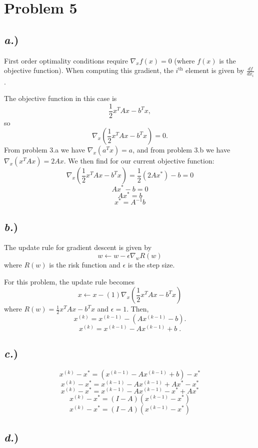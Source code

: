 \documentclass{report}
\begin{document}
\newpage
\section*{Problem 5}

\subsection*{\textit{a.})}

First order optimality conditions require $\nabla_xf(x) = 0$ (where $f(x)$ is the objective function). When computing this gradient, the $i^{\text{th}}$ element is given by $\frac{df}{dx_i}$.

The objective function in this case is 
$$ \frac{1}{2}x^TAx-b^Tx ,$$
so 
$$ \nabla_x\left(\frac{1}{2}x^TAx-b^Tx\right) = 0 .$$
From problem 3.a we have $\nabla_x(a^Tx) = a$, and from problem 3.b we have $\nabla_x(x^TAx) = 2Ax$. We then find for our current objective function:
$$ \nabla_x\left(\frac{1}{2}x^TAx-b^Tx\right) = \frac{1}{2}(2Ax^*) - b = 0 $$
$$ Ax^* - b = 0 $$
$$ Ax^* = b $$
$$\boxed{ x^* = A^{-1}b }$$

\subsection*{\textit{b.})}

The update rule for gradient descent is given by
$$ w \leftarrow w - \epsilon\nabla_w R(w) $$
where $R(w)$ is the risk function and $\epsilon$ is the step size. 

For this problem, the update rule becomes
$$ x \leftarrow x - (1)\nabla_x\left(\frac{1}{2}x^TAx-b^Tx\right) $$
where $R(w) = \frac{1}{2}x^TAx-b^Tx$ and $\epsilon = 1$. Then,
$$ x^{(k)} = x^{(k-1)} - (Ax^{(k-1)}-b) .$$
$$\boxed{ x^{(k)} = x^{(k-1)} - Ax^{(k-1)} + b }\;.$$

\subsection*{\textit{c.})}

$$ x^{(k)} - x^* = (x^{(k-1)} - Ax^{(k-1)}+b) - x^*$$
$$ x^{(k)} - x^* = x^{(k-1)} - Ax^{(k-1)}+Ax^* - x^*$$
$$ x^{(k)} - x^* = x^{(k-1)} - Ax^{(k-1)} - x^* + Ax^*$$
$$ x^{(k)} - x^* = (I - A)(x^{(k-1)} - x^*) $$
$$\boxed{ x^{(k)} - x^* = (I-A)(x^{(k-1)} - x^*) }$$

\subsection*{\textit{d.})}
\end{document}
